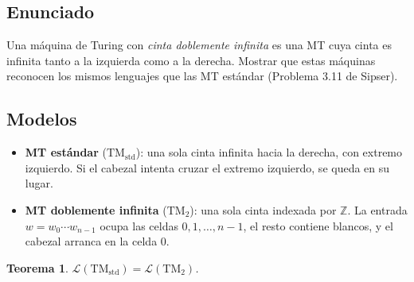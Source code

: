 \documentclass[11pt,a4paper]{article}
\theoremstyle{plain}
\newtheorem{teorema}{Teorema}[section]
\theoremstyle{definition}
\theoremstyle{remark}
\newcommand{\TM}{\mathrm{TM}}
\newcommand{\lang}{\mathcal{L}}
\newcommand{\TMstd}{\TM_{\text{std}}}
\newcommand{\TMtwo}{\TM_{2}}
\begin{document}
\subsection*{Enunciado}

Una m\'aquina de Turing con \emph{cinta doblemente infinita} es una MT cuya
cinta es infinita tanto a la izquierda como a la derecha. Mostrar que estas
m\'aquinas reconocen los mismos lenguajes que las MT est\'andar
(Problema 3.11 de Sipser).

\subsection*{Modelos}

\begin{itemize}
  \item \textbf{MT est\'andar} ($\TMstd$): una sola cinta infinita hacia la
        derecha, con extremo izquierdo. Si el cabezal intenta cruzar el
        extremo izquierdo, se queda en su lugar.
  \item \textbf{MT doblemente infinita} ($\TMtwo$): una sola cinta indexada
        por $\mathbb Z$. La entrada $w=w_0\cdots w_{n-1}$ ocupa las celdas
        $0,1,\dots,n-1$, el resto contiene blancos, y el cabezal arranca en
        la celda $0$.
\end{itemize}

\begin{teorema}
\label{teo:doble}
$\lang(\TMstd) = \lang(\TMtwo)$.
\end{teorema}
\end{document}
